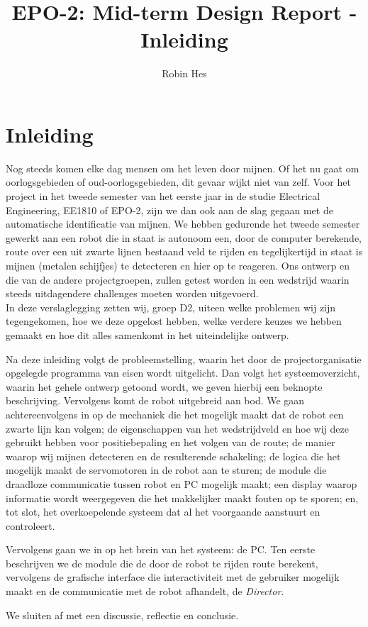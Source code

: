 \documentclass{report}
\title{EPO-2: Mid-term Design Report - Inleiding}
\author{Robin Hes}
\begin{document}
\chapter{Inleiding}
\label{ch:inleiding}

Nog steeds komen elke dag mensen om het leven door mijnen. Of het nu gaat om oorlogsgebieden of oud-oorlogsgebieden, dit gevaar wijkt niet van zelf. Voor het project in het tweede semester van het eerste jaar in de studie Electrical Engineering, EE1810 of EPO-2, zijn we dan ook aan de slag gegaan met de automatische identificatie van mijnen. We hebben gedurende het tweede semester gewerkt aan een robot die in staat is autonoom een, door de computer berekende, route over een uit zwarte lijnen bestaand veld te rijden en tegelijkertijd in staat is mijnen (metalen schijfjes) te detecteren en hier op te reageren. Ons ontwerp en die van de andere projectgroepen, zullen getest worden in een wedstrijd waarin steeds uitdagendere challenges moeten worden uitgevoerd.
\\

\noindent
In deze verslaglegging zetten wij, groep D2, uiteen welke problemen wij zijn tegengekomen, hoe we deze opgelost hebben, welke verdere keuzes we hebben gemaakt en hoe dit alles samenkomt in het uiteindelijke ontwerp.

Na deze inleiding volgt de probleemstelling, waarin het door de projectorganisatie opgelegde programma van eisen wordt uitgelicht. Dan volgt het systeemoverzicht, waarin het gehele ontwerp getoond wordt, we geven hierbij een beknopte beschrijving.
Vervolgens komt de robot uitgebreid aan bod. We gaan achtereenvolgens in op de mechaniek die het mogelijk maakt dat de robot een zwarte lijn kan volgen; de eigenschappen van het wedstrijdveld en hoe wij deze gebruikt hebben voor positiebepaling en het volgen van de route; de manier waarop wij mijnen detecteren en de resulterende schakeling; de logica die het mogelijk maakt de servomotoren in de robot aan te sturen; de module die draadloze communicatie tussen robot en PC mogelijk maakt; een display waarop informatie wordt weergegeven die het makkelijker maakt fouten op te sporen; en, tot slot, het overkoepelende systeem dat al het voorgaande aanstuurt en controleert.

Vervolgens gaan we in op het brein van het systeem: de PC. Ten eerste beschrijven we de module die de door de robot te rijden route berekent, vervolgens de  grafische interface die interactiviteit met de gebruiker mogelijk maakt en de communicatie met de robot afhandelt, de \textit{Director}.

We sluiten af met een discussie, reflectie en conclusie.
\end{document}

